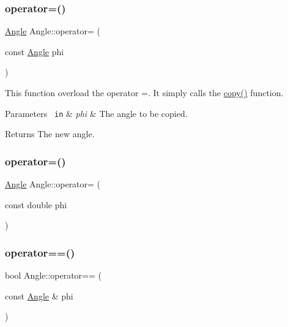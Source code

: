 \subsubsection{\texorpdfstring{operator=()}{operator=()}\hspace{0.1cm}{\footnotesize\ttfamily [1/2]}}
{\footnotesize\ttfamily \mbox{\hyperlink{class_angle}{Angle}} Angle\+::operator= (\begin{DoxyParamCaption}\item[{const \mbox{\hyperlink{class_angle}{Angle}}}]{phi }\end{DoxyParamCaption})\hspace{0.3cm}{\ttfamily [inline]}}

This function overload the operator =. It simply calls the {\ttfamily \mbox{\hyperlink{class_angle_ab1c34d25d3235e639313e5d48d98a6f6}{copy()}}} function. 
\begin{DoxyParams}[1]{Parameters}
\mbox{\texttt{ in}}  & {\em phi} & The angle to be copied. \\
\hline
\end{DoxyParams}
\begin{DoxyReturn}{Returns}
The new angle. 
\end{DoxyReturn}
\mbox{\label{class_angle_adf9e68cdeac72b3754bd7d0993a37220}} 
\subsubsection{\texorpdfstring{operator=()}{operator=()}\hspace{0.1cm}{\footnotesize\ttfamily [2/2]}}
{\footnotesize\ttfamily \mbox{\hyperlink{class_angle}{Angle}} Angle\+::operator= (\begin{DoxyParamCaption}\item[{const double}]{phi }\end{DoxyParamCaption})\hspace{0.3cm}{\ttfamily [inline]}}

\mbox{\label{class_angle_affdc9a2590df21c00fcbe01e5dadaf25}} 
\subsubsection{\texorpdfstring{operator==()}{operator==()}}
{\footnotesize\ttfamily bool Angle\+::operator== (\begin{DoxyParamCaption}\item[{const \mbox{\hyperlink{class_angle}{Angle}} \&}]{phi }\end{DoxyParamCaption})\hspace{0.3cm}{\ttfamily [inline]}}

